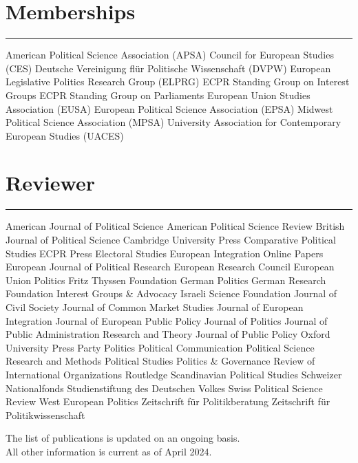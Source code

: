 \section*{Memberships}\vspace{-2em}\rule{\textwidth}{0.5pt}\nzb
American Political Science Association (APSA)\nzs
Council for European Studies (CES)\nzs
Deutsche Vereinigung fl\"ur Politische Wissenschaft (DVPW)\nzs
European Legislative Politics Research Group (ELPRG)\nzs
ECPR Standing Group on Interest Groups\nzs
ECPR Standing Group on Parliaments\nzs
European Union Studies Association (EUSA)\nzs
European Political Science Association (EPSA)\nzs
Midwest Political Science Association (MPSA)\nzs
University Association for Contemporary European Studies (UACES)


\section*{Reviewer}\vspace{-2em}\rule{\textwidth}{0.5pt}\nzb
American Journal of Political Science\nzs
American Political Science Review\nzs
British Journal of Political Science\nzs
Cambridge University Press\nzs
Comparative Political Studies\nzs
ECPR Press\nzs
Electoral Studies\nzs
European Integration Online Papers\nzs
European Journal of Political Research\nzs
European Research Council\nzs
European Union Politics\nzs
Fritz Thyssen Foundation\nzs
German Politics\nzs
German Research Foundation\nzs
Interest Groups \& Advocacy\nzs
Israeli Science Foundation\nzs
Journal of Civil Society\nzs
Journal of Common Market Studies\nzs
Journal of European Integration\nzs
Journal of European Public Policy\nzs
Journal of Politics\nzs
Journal of Public Administration Research and Theory\nzs
Journal of Public Policy\nzs
Oxford University Press\nzs
Party Politics\nzs
Political Communication\nzs
Political Science Research and Methods\nzs
Political Studies\nzs
Politics \& Governance\nzs
Review of International Organizations\nzs
Routledge\nzs
Scandinavian Political Studies\nzs
Schweizer Nationalfonds\nzs
Studienstiftung des Deutschen Volkes\nzs
Swiss Political Science Review\nzs
West European Politics\nzs
Zeitschrift für Politikberatung\nzs
Zeitschrift für Politikwissenschaft

\vspace{4em}
The list of publications is updated on an ongoing basis.\\All other information is current as of April 2024.
